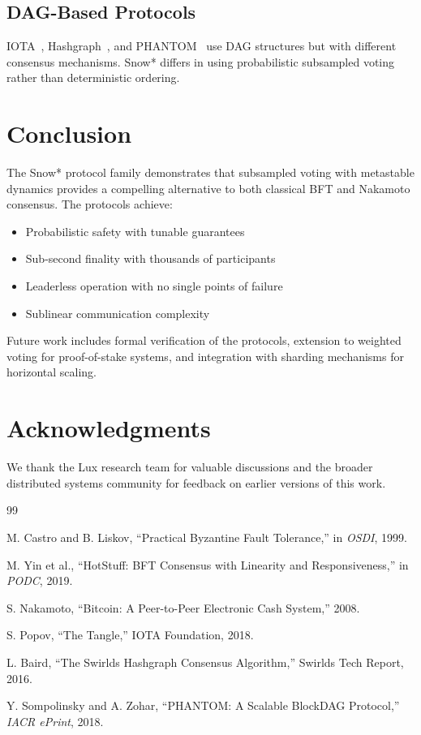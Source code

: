 \documentclass[11pt,a4paper]{article}
\begin{document}
\subsection{DAG-Based Protocols}

IOTA~\cite{iota}, Hashgraph~\cite{hashgraph}, and PHANTOM~\cite{phantom} use DAG structures but with different consensus mechanisms. Snow* differs in using probabilistic subsampled voting rather than deterministic ordering.

\section{Conclusion}

The Snow* protocol family demonstrates that subsampled voting with metastable dynamics provides a compelling alternative to both classical BFT and Nakamoto consensus. The protocols achieve:

\begin{itemize}
    \item Probabilistic safety with tunable guarantees
    \item Sub-second finality with thousands of participants
    \item Leaderless operation with no single points of failure
    \item Sublinear communication complexity
\end{itemize}

Future work includes formal verification of the protocols, extension to weighted voting for proof-of-stake systems, and integration with sharding mechanisms for horizontal scaling.

\section*{Acknowledgments}

We thank the Lux research team for valuable discussions and the broader distributed systems community for feedback on earlier versions of this work.

\begin{thebibliography}{99}

M. Castro and B. Liskov, ``Practical Byzantine Fault Tolerance,'' in \textit{OSDI}, 1999.

M. Yin et al., ``HotStuff: BFT Consensus with Linearity and Responsiveness,'' in \textit{PODC}, 2019.

S. Nakamoto, ``Bitcoin: A Peer-to-Peer Electronic Cash System,'' 2008.

S. Popov, ``The Tangle,'' IOTA Foundation, 2018.

L. Baird, ``The Swirlds Hashgraph Consensus Algorithm,'' Swirlds Tech Report, 2016.

Y. Sompolinsky and A. Zohar, ``PHANTOM: A Scalable BlockDAG Protocol,'' \textit{IACR ePrint}, 2018.

\end{thebibliography}
\end{document}
